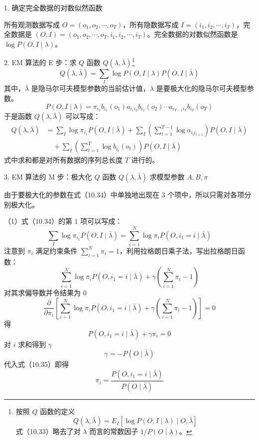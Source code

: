 \documentclass[UTF8,12pt,a4paper,fontset=fandol]{ctexart}
\begin{document}
1. 确定完全数据的对数似然函数

所有观测数据写成 $O=(o_1,o_2,\cdots,o_T)$，所有隐数据写成 $I=(i_1,i_2,\cdots,i_T)$，完全数据是 $(O,I)=(o_1,o_2,\cdots,o_T,i_1,i_2,\cdots,i_T)$。完全数据的对数似然函数是 $\log P(O,I\mid\lambda)$。

2. EM 算法的 E 步：求 $Q$ 函数 $Q(\lambda,\bar\lambda)$\footnote{按照 $Q$ 函数的定义
\[
  Q(\lambda,\bar\lambda)=E_I[\log P(O,I\mid\lambda)\mid O,\bar\lambda]
\]
式（10.33）略去了对 $\lambda$ 而言的常数因子 $1/P(O\mid\lambda)$。}
\begin{equation}
  Q(\lambda,\bar\lambda)=\sum_I \log P(O,I\mid\lambda)P(O,I\mid\bar\lambda)
  \tag{10.33}
\end{equation}
其中，$\bar\lambda$ 是隐马尔可夫模型参数的当前估计值，$\lambda$ 是要极大化的隐马尔可夫模型参数。
\[
  P(O,I\mid\lambda)=\pi_{i_1}b_{i_1}(o_1)a_{i_1i_2}b_{i_2}(o_2)\cdots a_{i_{T-1}i_T}b_{i_T}(o_T)
\]
于是函数 $Q(\lambda,\bar\lambda)$ 可以写成：
\begin{equation}
\begin{aligned}
  Q(\lambda,\bar\lambda)
  &=
  \sum_I \log\pi_{i_1}P(O,I\mid\bar\lambda)
  +\sum_I\left(\sum_{t=1}^{T-1}\log a_{i_t i_{t+1}}\right)P(O,I\mid\bar\lambda)\\
  &\quad
  +\sum_I\left(\sum_{t=1}^{T}\log b_{i_t}(o_t)\right)P(O,I\mid\bar\lambda)
\end{aligned}
  \tag{10.34}
\end{equation}
式中求和都是对所有数据的序列总长度 $T$ 进行的。

3. EM 算法的 M 步：极大化 $Q$ 函数 $Q(\lambda,\bar\lambda)$ 求模型参数 $A,B,\pi$

由于要极大化的参数在式（10.34）中单独地出现在 $3$ 个项中，所以只需对各项分别极大化。

（1）式（10.34）的第 $1$ 项可以写成：
\[
  \sum_I \log\pi_{i_1}P(O,I\mid\bar\lambda)=\sum_{i=1}^N\log\pi_i P(O,i_1=i\mid\bar\lambda)
\]
注意到 $\pi_i$ 满足约束条件 $\sum_{i=1}^N\pi_i=1$，利用拉格朗日乘子法，写出拉格朗日函数：
\[
  \sum_{i=1}^N\log\pi_i P(O,i_1=i\mid\bar\lambda)
  +\gamma\left(\sum_{i=1}^N\pi_i-1\right)
\]
对其求偏导数并令结果为 $0$
\begin{equation}
  \frac{\partial}{\partial\pi_i}
  \left[
  \sum_{i=1}^N\log\pi_i P(O,i_1=i\mid\bar\lambda)
  +\gamma\left(\sum_{i=1}^N\pi_i-1\right)
  \right]=0
  \tag{10.35}
\end{equation}
得
\[
  P(O,i_1=i\mid\bar\lambda)+\gamma\pi_i=0
\]
对 $i$ 求和得到 $\gamma$
\[
  \gamma=-P(O\mid\bar\lambda)
\]
代入式（10.35）即得
\begin{equation}
  \pi_i=\frac{P(O,i_1=i\mid\bar\lambda)}{P(O\mid\bar\lambda)}
  \tag{10.36}
\end{equation}
\end{document}
